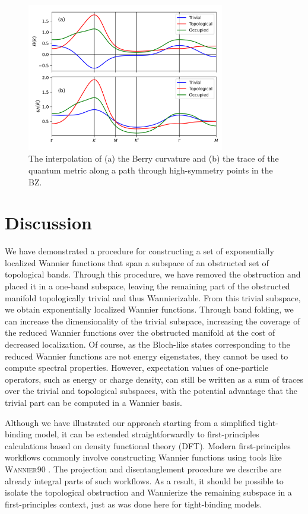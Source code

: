\documentclass[galley,aps,pra,10pt,amsmath,amssymb,
    superscriptaddress,nofootinbib,longbibliography]{revtex4-2}
\newcounter{comm}
\begin{document}
\begin{figure}[t]
\begin{center}
\includegraphics[width=3.4in]{fig9.png}
\end{center}
\vspace{-10mm}
\caption{The interpolation of (a) the Berry curvature and (b) the trace of the quantum metric along a path through high-symmetry points in the BZ. }
\label{FIG9}
\end{figure}

\section{Discussion}
We have demonstrated a procedure for constructing a set of exponentially localized Wannier functions that span a subspace of an obstructed set of topological bands. Through this procedure, we have removed the obstruction and placed it in a one-band subspace, leaving the remaining part of the obstructed manifold topologically trivial and thus Wannierizable. From this trivial subspace, we obtain exponentially localized Wannier functions. Through band folding, we can increase the dimensionality of the trivial subspace, increasing the coverage of the reduced Wannier functions over the obstructed manifold at the cost of decreased localization. Of course, as the Bloch-like states corresponding to the reduced Wannier functions are not energy eigenstates, they cannot be used to compute spectral properties. However, expectation values of one-particle operators, such as energy or charge density, can still be written as a sum of traces over the trivial and topological subspaces, with the potential advantage that the trivial part can be computed in a Wannier basis. 

Although we have illustrated our approach starting from a simplified tight-binding model, it can be extended straightforwardly to first-principles calculations based on density functional theory (DFT). Modern first-principles workflows commonly involve constructing Wannier functions using tools like \textsc{Wannier90} \cite{MOSTOFI20142309, Marrazzo2023TheWS}. The projection and disentanglement procedure we describe are already integral parts of such workflows. As a result, it should be possible to isolate the topological obstruction and Wannierize the remaining subspace in a first-principles context, just as was done here for tight-binding models.
\end{document}
